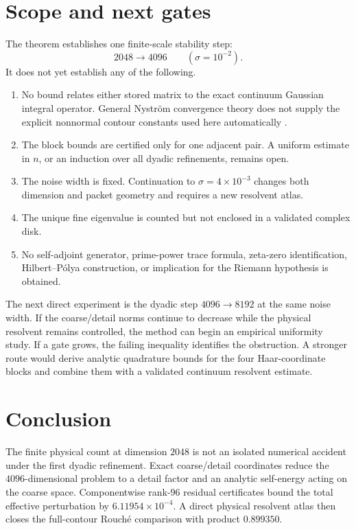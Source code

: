 \documentclass[11pt]{article}
\theoremstyle{definition}
\theoremstyle{remark}
\begin{document}
\section{Scope and next gates}
\label{sec:scope}

The theorem establishes one finite-scale stability step:
\[
 2048\longrightarrow4096
 \qquad(\sigma=10^{-2}).
\]
It does not yet establish any of the following.
\begin{enumerate}[leftmargin=2em]
 \item No bound relates either stored matrix to the exact continuum Gaussian
       integral operator.  General Nystr\"om convergence theory does not supply
       the explicit nonnormal contour constants used here automatically
       \citep{Atkinson1997}.
 \item The block bounds are certified only for one adjacent pair.  A uniform
       estimate in \(n\), or an induction over all dyadic refinements, remains
       open.
 \item The noise width is fixed.  Continuation to
       \(\sigma=4\times10^{-3}\) changes both dimension and packet geometry and
       requires a new resolvent atlas.
 \item The unique fine eigenvalue is counted but not enclosed in a validated
       complex disk.
 \item No self-adjoint generator, prime-power trace formula, zeta-zero
       identification, Hilbert--P\'olya construction, or implication for the
       Riemann hypothesis is obtained.
\end{enumerate}

The next direct experiment is the dyadic step \(4096\to8192\) at the same
noise width.  If the coarse/detail norms continue to decrease while the
physical resolvent remains controlled, the method can begin an empirical
uniformity study.  If a gate grows, the failing inequality identifies the
obstruction.  A stronger route would derive analytic quadrature bounds for
the four Haar-coordinate blocks and combine them with a validated continuum
resolvent estimate.

\section{Conclusion}

The finite physical count at dimension \(2048\) is not an isolated numerical
accident under the first dyadic refinement.  Exact coarse/detail coordinates
reduce the \(4096\)-dimensional problem to a detail factor and an analytic
self-energy acting on the coarse space.  Componentwise rank-\(96\) residual
certificates bound the total effective perturbation by
\(6.11954\times10^{-4}\).  A direct physical resolvent atlas then closes the
full-contour Rouch\'e comparison with product \(0.899350\).
\end{document}
